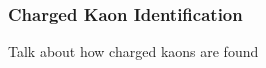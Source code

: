 \subsubsection{Charged Kaon Identification}
\label{ChargedKaonIdentification}

Talk about how charged kaons are found